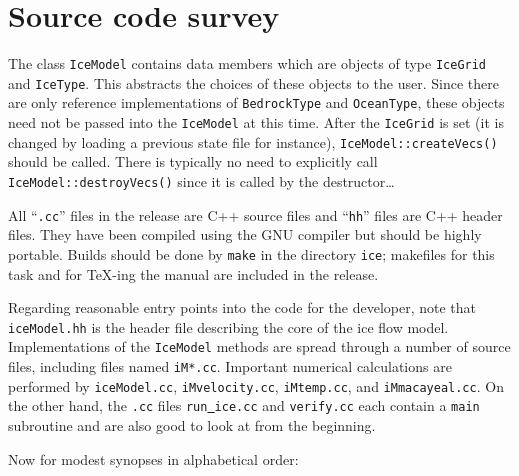 \documentclass[final]{amsart}
\renewcommand{\t}[1]{\texttt{#1}}
\begin{document}
\section{Source code survey}

The class \t{IceModel} contains data members which are objects of type \t{IceGrid} and \t{IceType}.  This abstracts the choices of these objects to the
user.  Since there are only reference implementations of \t{BedrockType} and \t{OceanType},
these objects need not be passed into the \t{IceModel} at this time.  After the \t{IceGrid}
is set (it is changed by loading a previous state file for instance),
\t{IceModel::createVecs()} should be called. There is typically no need to explicitly call
\t{IceModel::destroyVecs()} since it is called by the destructor\dots

All ``\t{.cc}'' files in the release are C++ source files and ``\t{hh}'' files are C++ header files.  They have been compiled using the GNU compiler but should be highly portable.  Builds should be done by \t{make} in the directory \t{ice}; makefiles for this task and for \TeX-ing the manual are included in the release.

Regarding reasonable entry points into the code for the developer, note that \t{iceModel.hh} is the header file describing the core of the ice flow model.  Implementations of the \t{IceModel} methods are spread through a number of source files, including files named \t{iM*.cc}.  Important numerical calculations are performed by \t{iceModel.cc}, \t{iMvelocity.cc}, \t{iMtemp.cc}, and \t{iMmacayeal.cc}.  On the other hand, the \t{.cc} files \t{run\underline{ }ice.cc} and \t{verify.cc} each contain a \t{main} subroutine and are also good to look at from the beginning.

Now for modest synopses in alphabetical order:\bigskip
\newcommand{\hfileno}[1]{\noindent\t{ice/#1.hh:}\par}
\newcommand{\Cfile}[2]{\noindent\t{ice/#1.cc:}\par \begin{quote}#2\end{quote}\par\medskip}
\newcommand{\hfile}[2]{\noindent\t{ice/#1.hh:}\par \begin{quote}#2\end{quote}\par\medskip}
\newcommand{\iceinputFile}[2]{\noindent\t{ice-input/#1:}\par \begin{quote}#2\end{quote}\par\medskip}
\end{document}
